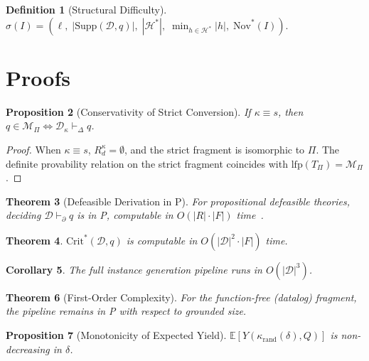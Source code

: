 \documentclass{article}
\newtheorem{theorem}{Theorem}[section]
\newtheorem{proposition}[theorem]{Proposition}
\newtheorem{corollary}[theorem]{Corollary}
\theoremstyle{definition}
\newtheorem{definition}[theorem]{Definition}
\newcommand{\D}{\mathcal{D}}
\newcommand{\Hgold}{\mathcal{H}^{*}}
\newcommand{\Rd}{R_d}
\newcommand{\partfunc}{\kappa}
\newcommand{\Supp}{\mathrm{Supp}}
\newcommand{\CritStar}{\mathrm{Crit}^{*}}
\newcommand{\Nov}{\mathrm{Nov}}
\newcommand{\pDelta}{\vdash_{\Delta}}
\newcommand{\pPartial}{\vdash_{\partial}}
\begin{document}
\begin{definition}[Structural Difficulty]\label{def:structdiff}
$\sigma(I) = (\ell,\; |\Supp(\D, q)|,\; |\Hgold|,\; \min_{h \in \Hgold} |h|,\; \Nov^*(I))$.
\end{definition}


\section{Proofs}\label{app:proofs}

\begin{proposition}[Conservativity of Strict Conversion]\label{prop:strict}
If $\partfunc \equiv s$, then $q \in \mathcal{M}_\Pi \iff \D_\partfunc \pDelta q$.
\end{proposition}

\begin{proof}
When $\partfunc \equiv s$, $\Rd^{\partfunc} = \emptyset$, and the strict fragment is isomorphic to $\Pi$. The definite provability relation on the strict fragment coincides with $\mathrm{lfp}(T_\Pi) = \mathcal{M}_\Pi$.
\end{proof}

\begin{theorem}[Defeasible Derivation in P]\label{thm:derivP}
For propositional defeasible theories, deciding $\D \pPartial q$ is in P, computable in $O(|R| \cdot |F|)$ time~\citep{maher2001propositional}.
\end{theorem}

\begin{theorem}\label{thm:critP}
$\CritStar(\D, q)$ is computable in $O(|\D|^2 \cdot |F|)$ time.
\end{theorem}

\begin{corollary}\label{cor:cubic}
The full instance generation pipeline runs in $O(|\D|^3)$.
\end{corollary}

\begin{theorem}[First-Order Complexity]\label{thm:firstorder}
For the function-free (datalog) fragment, the pipeline remains in P with respect to grounded size.
\end{theorem}

\begin{proposition}[Monotonicity of Expected Yield]\label{prop:yieldmono}
$\mathbb{E}[Y(\partfunc_{\mathrm{rand}}(\delta), Q)]$ is non-decreasing in $\delta$.
\end{proposition}
\end{document}

